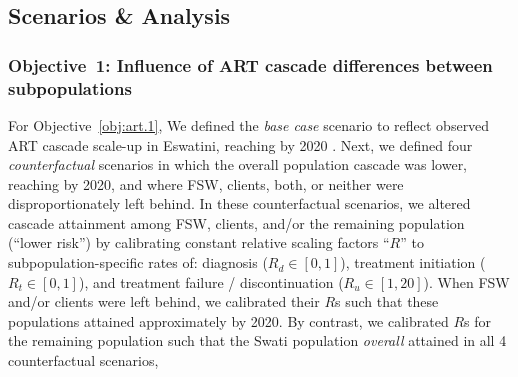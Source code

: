 \subsection{Scenarios \& Analysis}\label{art.meth.obj}
\subsubsection{Objective~1: Influence of ART cascade differences between subpopulations}\label{art.meth.obj.1}
For Objective~\ref{obj:art.1},
We defined the \emph{base case} scenario to reflect
observed ART cascade scale-up in Eswatini, reaching \cashi by 2020 \cite{SHIMS3}.
Next, we defined four \emph{counterfactual} scenarios in which
the overall population cascade was lower, reaching \casmd by 2020,
and where FSW, clients, both, or neither were disproportionately left behind.
In these counterfactual scenarios, we altered cascade attainment among
FSW, clients, and/or the remaining population (``lower risk'') by calibrating
constant relative scaling factors ``$R$'' to subpopulation-specific rates of:
diagnosis ($R_d \in [0,1]$),
treatment initiation ($R_t \in [0,1]$), and
treatment failure / discontinuation ($R_u \in [1,20]$).
When FSW and/or clients were left behind, we calibrated their $R$s such that
these populations attained approximately \caslo by 2020.
By contrast, we calibrated $R$s for the remaining population such that
the Swati population \emph{overall} attained \casmd in all 4 counterfactual scenarios,
